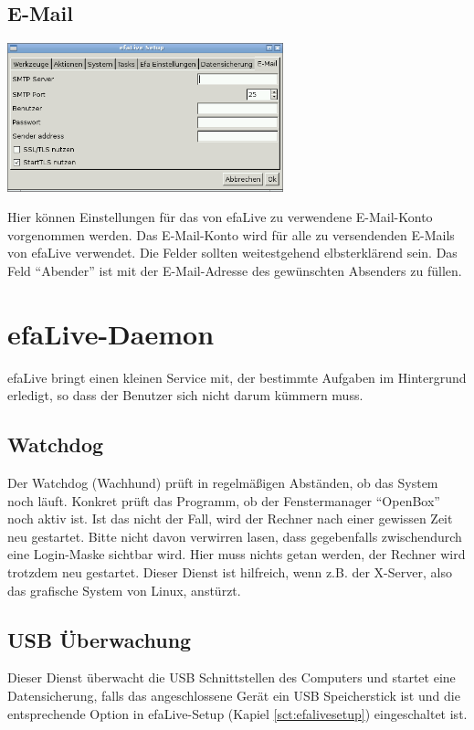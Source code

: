 \documentclass[a4paper,12pt,twoside]{article}
\begin{document}
\subsection{E-Mail}
\label{sct:efalivesetup_email}

\bigskip
\begin{minipage}{\linewidth}
    \centering
    \captionsetup{type=figure}
    \includegraphics[width=8cm]{screenshots/efalive_setup_email.png}
    \label{fig:efalivesetup_email}
\end{minipage}
\bigskip

Hier können Einstellungen für das von efaLive zu verwendene E-Mail-Konto
vorgenommen werden. Das E-Mail-Konto wird für alle zu versendenden E-Mails
von efaLive verwendet. Die Felder sollten weitestgehend elbsterklärend sein.
Das Feld "`Abender"' ist mit der E-Mail-Adresse des gewünschten Absenders zu
füllen.


\section{efaLive-Daemon}
\label{sct:efalivedaemon}
efaLive bringt einen kleinen Service mit, der bestimmte
Aufgaben im Hintergrund erledigt, so dass der Benutzer sich nicht
darum kümmern muss.


\subsection{Watchdog}
\label{sct:watchdog}
Der Watchdog (Wachhund) prüft in regelmäßigen Abständen, ob das System
noch läuft. Konkret prüft das Programm, ob der Fenstermanager "`OpenBox"'
noch aktiv ist. Ist das nicht der Fall, wird der Rechner nach einer gewissen
Zeit neu gestartet. Bitte nicht davon verwirren lasen, dass gegebenfalls
zwischendurch eine Login-Maske sichtbar wird. Hier muss nichts getan werden,
der Rechner wird trotzdem neu gestartet.
Dieser Dienst ist hilfreich, wenn z.B. der X-Server, also das grafische
System von Linux, anstürzt.


\subsection{USB Überwachung}
\label{sct:usb_monitor}
Dieser Dienst überwacht die USB Schnittstellen des Computers und startet
eine Datensicherung, falls das angeschlossene Gerät ein USB Speicherstick
ist und die entsprechende Option in efaLive-Setup (Kapiel \ref{sct:efalivesetup})
eingeschaltet ist.
\end{document}
